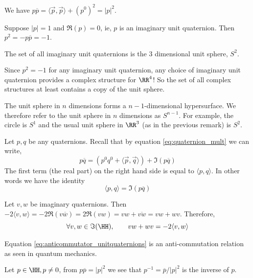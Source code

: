 \begin{remark*}
    We have $p\overline{p} = \langle \vec{p},\vec{p}\rangle + (p^0)^2 = |p|^2$.

    Suppose $|p|=1$ and $\Re(p)=0$, ie, $p$ is an imaginary unit quaternion. Then $p^2 = -p\overline{p}=-1$. 

    The set of all imaginary unit quaternions is the 3 dimensional unit sphere, $S^2$. 

    Since $p^2=-1$ for any imaginary unit quaternion, any choice of imaginary unit quaternion provides a complex structure for $\RR^4$! So the set of all complex structures at least contains a copy of the unit sphere.
\end{remark*}
\begin{remark*}
    The unit sphere in $n$ dimensions forms a $n-1$-dimensional hypersurface. We therefore refer to the unit sphere in $n$ dimensions as $S^{n-1}$. For example, the circle is $S^1$ and the usual unit sphere in $\RR^3$ (as in the previous remark) is $S^2$.
\end{remark*}
\begin{remark*}
    Let $p,q$ be any quaternions. Recall that by equation \eqref{eq:quaternion_mult} we can write,
    \[p\overline{q} = (p^0q^0 + \langle \vec{p},\vec{q}\rangle) + \Im (p\overline{q})\]
    The first term (the real part) on the right hand side is equal to $\langle p,q\rangle$. In other words we have the identity
    \begin{equation}
        \langle p,q\rangle = \Im(p\overline{q})
    \end{equation}
\end{remark*}
\begin{remark*}
    Let $v,w$ be imaginary quaternions. Then $-2\langle v,w\rangle = -2\Re(v\overline{w}) = 2\Re(vw)=vw+\overline{vw} = vw+wv$. Therefore,
    \begin{equation}
        \forall v,w\in \Im(\HH),\qquad vw+wv=-2\langle v,w\rangle \label{eq:anticommutator_unitquaternions}
    \end{equation}
\end{remark*}
\begin{physics*}
    Equation \eqref{eq:anticommutator_unitquaternions} is an anti-commutation relation as seen in quantum mechanics.
\end{physics*}
\begin{remark*}
    Let $p\in\HH,p\neq 0$, from $p\overline{p} = |p|^2$ we see that $p^{-1} = \overline{p}/|p|^2$ is the inverse of $p$.
\end{remark*}
